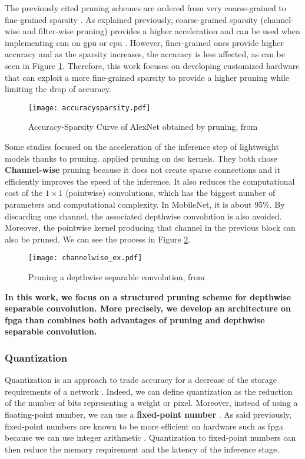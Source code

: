 %
The previously cited pruning schemes are ordered from very coarse-grained to fine-grained sparsity \cite{mao_exploring_2017}. As explained previously, coarse-grained sparsity (channel-wise and filter-wise pruning) provides a higher acceleration and can be used when implementing \acrshort{cnn} on \acrshort{gpu} or \acrshort{cpu} \cite{cheng_recent_2018, mao_exploring_2017}. However, finer-grained ones provide higher accuracy and as the sparsity increases, the accuracy is less affected, as can be seen in Figure \ref{fig:pruning-accuracy}. Therefore, this work focuses on developing customized hardware that can exploit a more fine-grained sparsity \cite{mao_exploring_2017} to provide a higher pruning while limiting the drop of accuracy.
%
\begin{figure}[H]
    \centering
    \texttt{[image: accuracysparsity.pdf]}
    \caption{Accuracy-Sparsity Curve of AlexNet obtained by pruning, from \cite{mao_exploring_2017}}
    \label{fig:pruning-accuracy}
\end{figure}
%
Some studies focused on the acceleration of the inference step of lightweight models thanks to pruning. \textcite{zhang_channel_2019, tu_pruning_2019} applied pruning on \acrshort{dsc} kernels. They both chose \textbf{Channel-wise} pruning because it does not create sparse connections and it efficiently improves the speed of the inference. It also reduces the computational cost of the $1 \times 1$ (pointwise) convolutions, which has the biggest number of parameters and computational complexity. In MobileNet, it is about 95\%. By discarding one channel, the associated depthwise convolution is also avoided.
Moreover, the pointwise kernel producing that channel in the previous block can also be pruned. We can see the process in Figure \ref{fig:pruning_dsc}.
%
\begin{figure}[H]
    \centering
    \texttt{[image: channelwise\_ex.pdf]}
    \caption{Pruning a depthwise separable convolution, from \cite{tu_pruning_2019}}
    \label{fig:pruning_dsc}
\end{figure}

\textbf{In this work, we focus on a structured pruning scheme for depthwise separable convolution. More precisely, we develop an architecture on \acrshort{fpga} than combines both advantages of pruning and depthwise separable convolution.}
%
\subsubsection{Quantization} \label{subs:quantization}
%
%
Quantization is an approach to trade accuracy for a decrease of the storage requirements of a network \cite{han_deep_2016}. Indeed, we can define quantization as the reduction of the number of bits representing a weight or pixel. Moreover, instead of using a floating-point number, we can use a \textbf{fixed-point number} \cite{cheng_recent_2018}. As said previously, fixed-point numbers are known to be more efficient on hardware such as \acrshort{fpga} because we can use integer arithmetic \cite{david_hardware_2007}. Quantization to fixed-point numbers can then reduce the memory requirement and the latency of the inference stage.

